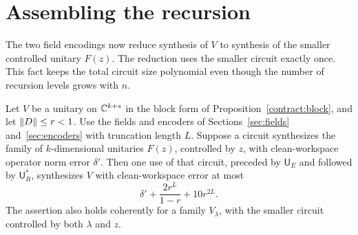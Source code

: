 \section{Assembling the recursion}\label{sec:recursion}

The two field encodings now reduce synthesis of $V$ to synthesis of the
smaller controlled unitary $F(z)$.  The reduction uses the smaller circuit
exactly once.  This fact keeps the total circuit size polynomial even though
the number of recursion levels grows with $n$.

\begin{lemma}\label{rec:step}
Let $V$ be a unitary on $\mathbb C^{k+s}$ in the block form of
Proposition~\ref{contract:block}, and let $\lVert D\rVert\leq r<1$.
Use the fields and encoders of Sections~\ref{sec:fields} and~\ref{sec:encoders}
with truncation length $L$.  Suppose a circuit synthesizes the family of
$k$-dimensional unitaries $F(z)$, controlled by $z$, with clean-workspace
operator norm error $\delta'$.  Then one use of that circuit, preceded by
$\mathsf U_E$ and followed by $\mathsf U_R^*$, synthesizes $V$ with
clean-workspace error at most
\begin{equation}\label{rec:step-error}
 \delta'+\frac{2r^L}{1-r}+10r^{2L}.
\end{equation}
The assertion also holds coherently for a family $V_\lambda$, with the
smaller circuit controlled by both $\lambda$ and $z$.
\end{lemma}

